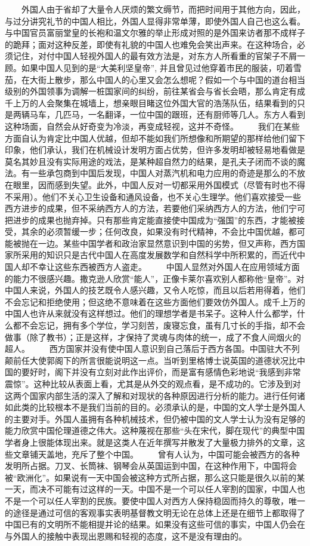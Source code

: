 \documentclass[12pt,oneside]{book}
\begin{document}
\begin{common-format}
　　外国人由于省却了大量令人厌烦的繁文缛节，而把时间用于其他方向，因此，与过分讲究礼节的中国人相比，外国人显得非常单薄，即使外国人自己也这么看。与中国官员富丽堂皇的长袍和温文尔雅的举止形成对照的是外国来访者那不成样子的跪拜；面对这种反差，即使有礼貌的中国人也难免会笑出声来。在这种场合，必须记住，对付中国人轻视外国人的最有效方法是，对东方人所看重的官架子不屑一顾。如果中国人见到的是“大美利坚皇帝”, 并且曾见过他穿着市民的服装，叨着雪茄，在大街上散步，那么中国人的心里又会怎么想呢？假如一个与中国的道台相当级别的外国领事为调解一桩国家间的纠纷，前往某省会与省长会晤，那么肯定有成千上万的人会聚集在城墙上，想亲眼目睹这位外国大官的浩荡队伍，结果看到的只是两辆马车，几匹马，一名翻译，一位中国的跟班，还有厨师等几人。东方人看到这种场面，自然会从好奇变为冷淡，再变成轻视，这并不奇怪。 
　　我们在某些方面自认为肯定比中国人优越，但却不能如我们所想像和所期望的那样给他们留下印象，他们承认，我们在机械设计发明方面占优势，但许多发明却被轻易地看做是莫名其妙且没有实际用途的戏法，是某种超自然力的结果，是孔夫子闭而不谈的魔法。有一些承包商到中国后发现，中国人对蒸汽机和电力应用的奇迹是那么的不放在眼里，因而感到失望。此外，中国人反对一切都采用外国模式（尽管有时也不得不采用）。他们不关心卫生设备和通风设备，也不关心生理学。他们喜欢接受一些西方进步的成果，但不采纳西方人的方法，若要他们采纳西方人的方法，他们宁可把进步的成果也抛弃掉。只有那些肯定能直接使中国成为“强国”的东西，才能被接受，其余的必须暂缓一步；任何改良，如果没有时代精神，不会比中国优越，都可能被抛在一边。某些中国学者和政治家显然意识到中国的劣势，但又声称，西方国家所采用的知识只是古代中国人在高度发展数学和自然科学中所积累的，而近代中国人却不幸让这些东西被西方人盗走。 
　　中国人显然对外国人在应用领域方面的能力不很感兴趣。撒克逊人欣赏“能人”，正像卡莱尔喜欢别人都称他“皇帝”。对中国人来说，外国人的技艺既令人感兴趣，又令人吃惊，而且以后若用得着，他们不会忘记和拒绝使用；但这绝不意味着在这些方面他们要效仿外国人。成千上万的中国人也许从来就没有这样想过。他们的理想学者是书呆子。这种人什么都学，什么都不会忘记，拥有多个学位，学习刻苦，废寝忘食，虽有几寸长的手指，却不会做事（除了教书）；正是这样，才保持了灵魂与肉体的统一，成了不食人间烟火的超人。 
　　西方国家并没有使中国人意识到自己落后于西方各国。中国驻大不列颠前任大使郭阁下的所言很能说明这一点。当听到里格博士说英国的道德状况比中国的要好时，阁下并没有立刻对此作出评价，而是富有感情色彩地说“我感到非常震惊”。这种比较从表面上看，尤其是从外交的观点看，是不成功的。它涉及到对这两个国家内部生活的深入了解和对现状的各种原因进行分析的能力。进行任何诸如此类的比较根本不是我们当前的目的。必须承认的是，中国的文人学士是外国人的主要对手。外国人虽拥有各种机械技术，但仍被中国的文人学士认为没有足够的能力欣赏中国伦理道德之伟大。这种蔑视在那些“头在宋代，脚在现代”的典型中国学者身上很能体现出来。就是这类人在近年撰写并散发了大量极力排外的文章，这些文章铺天盖地，充斥了整个中国。 
　　曾有人认为，中国可能会被西方的各种发明所占据。刀叉、长筒袜、钢琴会从英国运到中国，在这种作用下，中国将会被“欧洲化”。如果说有一天中国会被这种方式所占据，那么这只能是很久以前的某一天，而决不可能有过这样的一天。中国不是一个可以任人宰割的国家，中国人也不是一个可以任人宰割的民族。要使中国人对西方人保持稳固而持久的尊敬，唯一的途径是通过可信的客观事实表明基督教文明无论在总体上还是在细节上都取得了中国已有的文明所不能相提并论的结果。如果没有这些可信的事实，中国人仍会在与外国人的接触中表现出恩赐和轻视的态度，这不是没有理由的。


\end{common-format}
\end{document}
